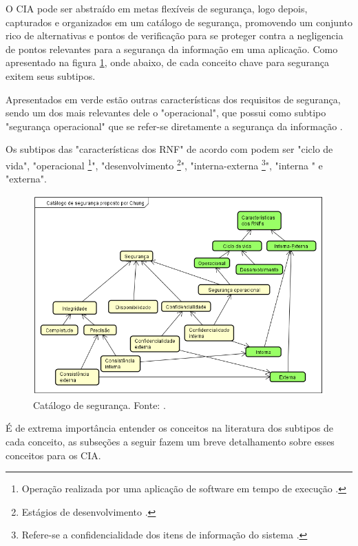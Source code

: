 O CIA pode ser abstraído em metas flexíveis de segurança, logo depois, capturados e organizados em um catálogo de segurança, promovendo um conjunto rico de alternativas e pontos de verificação para se proteger contra a negligencia de pontos relevantes para a segurança da informação em uma aplicação. Como apresentado na figura \ref{catalogoSegurancaChung}, onde abaixo, de cada conceito chave para segurança exitem seus subtipos. 

Apresentados em  verde estão outras características dos requisitos de segurança, sendo um dos mais relevantes dele o "operacional", que possui como subtipo "segurança operacional" que se refer-se diretamente a segurança da informação \cite{chung2012non}.

Os subtipos das "características dos RNF" de acordo com \cite{chung2012non} podem ser "ciclo de vida", "operacional \footnote[1]{Operação realizada por uma aplicação de software em tempo de execução \cite{chung2012non}.}", "desenvolvimento \footnote[2]{Estágios de desenvolvimento \cite{chung2012non}.}", "interna-externa \footnote[3]{Refere-se a confidencialidade dos itens de informação do sistema \cite{chung2012non}.}", "interna " e "externa".

\begin{figure}[h!]
	\centering
	\includegraphics[keepaspectratio=true,scale=0.9]{figuras/catalogoSegurancaChung.PNG}
	\caption{Catálogo de segurança. Fonte: \cite{chung2012non}.}
	\label{catalogoSegurancaChung}
\end{figure}

É de extrema importância entender os conceitos na literatura dos subtipos de cada conceito, as subseções a seguir fazem um breve detalhamento sobre esses conceitos para os CIA. 

